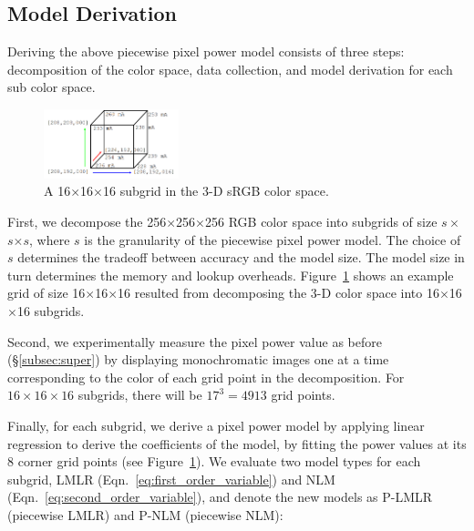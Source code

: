 

\subsection{Model Derivation}
\label{subsec:modelderivation}


Deriving the above piecewise pixel power model consists of three
steps: decomposition of the color space, data collection, and model
derivation for each sub color space.

\begin{figure}[tp]
	\includegraphics[width=0.35\textwidth]{./figure/004b_Cube_Model.png}
        \vspace{-0.1in}
	\caption{A 16$\times$16$\times$16 subgrid in the 3-D sRGB color space.}
        \vspace{-0.15in}
	\label{fig:cube_model}
\end{figure}


First, we decompose the 256$\times$256$\times$256 RGB color space into
subgrids of size $s\times$$s$$\times$$s$, where $s$ is the granularity of
the piecewise pixel power model. The choice of $s$ determines the
tradeoff between accuracy and the model size. The model size in turn
determines the memory and lookup
overheads. Figure~\ref{fig:cube_model} shows an example grid
of size 16$\times$16$\times$16 resulted from decomposing the
3-D color space into 16$\times$16$\times$16 subgrids.

Second, we experimentally measure the pixel power value as before
(\S\ref{subsec:super}) by displaying monochromatic images one at a time
corresponding to the color of each grid point in the decomposition. For
$16\times 16 \times 16$ subgrids, there will be $17^3 = 4913$ grid
points.

Finally, for each subgrid, we derive a pixel power model by applying linear regression 
to derive the coefficients of the model, \ie by fitting the power values at its 8 corner grid points
(see Figure~\ref{fig:cube_model}).  We
evaluate two model types for each subgrid, LMLR
(Eqn.~\ref{eq:first_order_variable}) and NLM (Eqn.~\ref{eq:second_order_variable}),
and denote the new models as P-LMLR (piecewise LMLR) and P-NLM (piecewise NLM):

